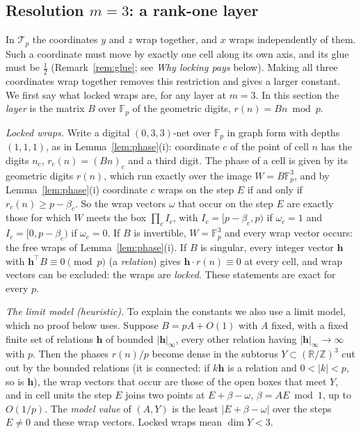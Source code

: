 \documentclass[11pt]{amsart}
\theoremstyle{definition}
\theoremstyle{plain}
\newcommand{\Z}{\mathbb{Z}}
\newcommand{\F}{\mathbb{F}}
\providecommand{\R}{\mathbb{R}}
\begin{document}
\subsection{Resolution \texorpdfstring{$m=3$}{m=3}: a rank-one layer}\label{sec:wnet}
In $\mathcal T_p$ the coordinates $y$ and $z$ wrap together, and $x$ wraps independently of them. Such a coordinate must move by exactly one cell along its own axis, and its glue must be $\frac12$ (Remark~\ref{rem:glue}; see \emph{Why locking pays} below). Making all three coordinates wrap together removes this restriction and gives a larger constant. We first say what locked wraps are, for any layer at $m=3$. In this section the \emph{layer} is the matrix $B$ over $\F_p$ of the geometric digits, $r(n)=Bn\bmod p$.

\emph{Locked wraps.} Write a digital $(0,3,3)$-net over $\F_p$ in graph form with depths $(1,1,1)$, as in Lemma~\ref{lem:phase}(i): coordinate $c$ of the point of cell $n$ has the digits $n_c$, $r_c(n)=(Bn)_c$ and a third digit. The phase of a cell is given by its geometric digits $r(n)$, which run exactly over the image $W=B\F_p^3$, and by Lemma~\ref{lem:phase}(i) coordinate $c$ wraps on the step $E$ if and only if $r_c(n)\ge p-\beta_c$. So the wrap vectors $\omega$ that occur on the step $E$ are exactly those for which $W$ meets the box $\prod_cI_c$, with $I_c=[p-\beta_c,p)$ if $\omega_c=1$ and $I_c=[0,p-\beta_c)$ if $\omega_c=0$. If $B$ is invertible, $W=\F_p^3$ and every wrap vector occurs: the free wraps of Lemma~\ref{lem:phase}(i). If $B$ is singular, every integer vector $\mathbf h$ with $\mathbf h^{\!\top}B\equiv0\pmod p$ (a \emph{relation}) gives $\mathbf h\cdot r(n)\equiv0$ at every cell, and wrap vectors can be excluded: the wraps are \emph{locked}. These statements are exact for every $p$.

\emph{The limit model (heuristic).} To explain the constants we also use a limit model, which no proof below uses. Suppose $B=pA+O(1)$ with $A$ fixed, with a fixed finite set of relations $\mathbf h$ of bounded $|\mathbf h|_\infty$, every other relation having $|\mathbf h|_\infty\to\infty$ with $p$. Then the phases $r(n)/p$ become dense in the subtorus $Y\subset(\R/\Z)^3$ cut out by the bounded relations (it is connected: if $k\mathbf h$ is a relation and $0<|k|<p$, so is $\mathbf h$), the wrap vectors that occur are those of the open boxes that meet $Y$, and in cell units the step $E$ joins two points at $E+\beta-\omega$, $\beta=AE\bmod1$, up to $O(1/p)$. The \emph{model value} of $(A,Y)$ is the least $|E+\beta-\omega|$ over the steps $E\ne0$ and these wrap vectors. Locked wraps mean $\dim Y<3$.
\end{document}
